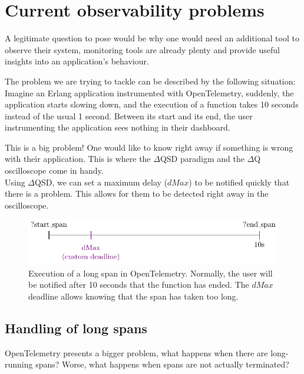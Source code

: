 \section{Current observability problems}

    A legitimate question to pose would be why one would need an additional tool to observe their system, monitoring tools are already plenty and provide useful insights into an application's behaviour.

    The problem we are trying to tackle can be described by the following situation: 
    Imagine an Erlang application instrumented with OpenTelemetry, suddenly, the application starts slowing down, and the execution of a function takes 10 seconds instead of the usual 1 second. Between its start and its end, the user instrumenting the application sees nothing in their dashboard.
    
    This is a big problem! One would like to know right away if something is wrong with their application. This is where the $\Delta$QSD paradigm and the $\Delta$Q oscilloscope come in handy. \\ 
   Using $\Delta$QSD, we can set a maximum delay ($dMax$) to be notified quickly that there is a problem. This allows for them to be detected right away in the oscilloscope.
   
   \begin{figure}[H]
        \begin{center}
            \includegraphics{tikz/start_end_dmax.pdf}
        \end{center}
        \caption{Execution of a long span in OpenTelemetry. Normally, the user will be notified after 10 seconds that the function has ended. The $dMax$ deadline allows knowing that the span has taken too long.}
        \label{fig:otel_dmax}
    \end{figure} 


    \subsection{Handling of long spans}
        OpenTelemetry presents a bigger problem, what happens when there are long-running spans? Worse, what happens when spans are not actually terminated?
        
